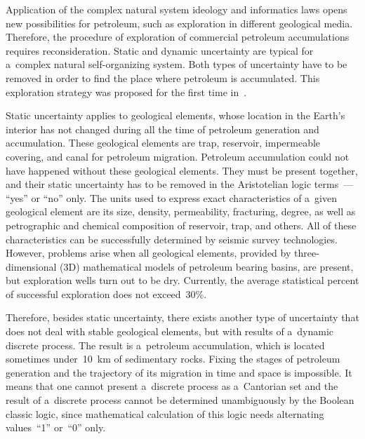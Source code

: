 \begin{multicols}{2}
     Application of the complex natural system ideology and informatics laws 
opens new possibilities for petroleum, such as exploration in different geological 
media. Therefore, the procedure of exploration of commercial petroleum 
accumulations requires reconsideration. Static and dynamic uncertainty are typical 
for a~complex natural self-organizing system. Both types of uncertainty have to be 
removed in order to find the place where petroleum is accumulated. This 
exploration strategy was proposed for the first time in~\cite{12-seif}.
     
     Static uncertainty applies to geological elements, whose location in the 
Earth's interior has not changed during all the time of petroleum generation and 
accumulation. These geological elements are trap, reservoir, impermeable 
covering, and canal for petroleum migration. Petroleum accumulation could not 
have happened without these geological elements. They must be present together, 
and their static uncertainty has to be removed in the Aristotelian logic terms~--- 
``yes'' or ``no'' only. The units used to express exact characteristics of a~given 
geological element are its size, density, permeability, fracturing, degree, as well as 
petrographic and chemical composition of reservoir, trap, and others. All of these 
characteristics can be successfully determined by seismic survey technologies. 
However, problems arise when all geological elements, provided by three-dimensional (3D) 
mathematical models of petroleum bearing basins, are present, but exploration 
wells turn out to be dry. Currently, the average statistical percent of successful 
exploration does not exceed~30\%. 
     
     Therefore, besides static uncertainty, there exists another type of uncertainty 
that does not deal with stable geological elements, but with results of a~dynamic 
discrete process. The result is a~petroleum accumulation, which is located 
sometimes under~10~km of sedimentary rocks. Fixing the stages of petroleum 
generation and the trajectory of its migration in time and space is impossible. It 
means that one cannot present a~discrete process as a~Cantorian set and the result 
of a~discrete process cannot be determined unambiguously by the Boolean classic 
logic, since mathematical calculation of this logic needs alternating values~``1'' 
or~``0'' only. 
     

\end{multicols}
